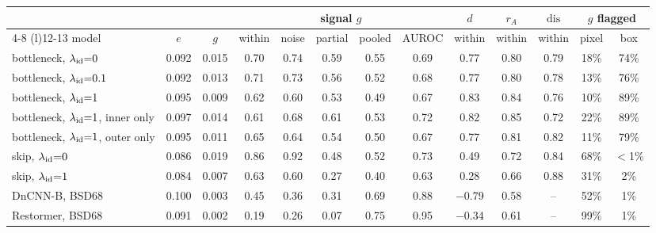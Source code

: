 \setlength{\tabcolsep}{4pt}
\begin{tabular}{@{}lcccccccccccc@{}}
\toprule
& & & \multicolumn{5}{c}{signal $g$} & $d$ & $r_A$ & $\mathrm{dis}$ & \multicolumn{2}{c}{$g$ flagged} \\
\cmidrule(lr){4-8} \cmidrule(l){12-13}
model & $e$ & $g$ & within & noise & partial & pooled & AUROC & within & within & within & pixel & box \\
\midrule
bottleneck, $\lambda_{\mathrm{id}}{=}0$ & 0.092 & 0.015 & 0.70 & 0.74 & 0.59 & 0.55 & 0.69 & 0.77 & 0.80 & 0.79 & 18\% & 74\% \\
bottleneck, $\lambda_{\mathrm{id}}{=}0.1$ & 0.092 & 0.013 & 0.71 & 0.73 & 0.56 & 0.52 & 0.68 & 0.77 & 0.80 & 0.78 & 13\% & 76\% \\
bottleneck, $\lambda_{\mathrm{id}}{=}1$ & 0.095 & 0.009 & 0.62 & 0.60 & 0.53 & 0.49 & 0.67 & 0.83 & 0.84 & 0.76 & 10\% & 89\% \\
bottleneck, $\lambda_{\mathrm{id}}{=}1$, inner only & 0.097 & 0.014 & 0.61 & 0.68 & 0.61 & 0.53 & 0.72 & 0.82 & 0.85 & 0.72 & 22\% & 89\% \\
bottleneck, $\lambda_{\mathrm{id}}{=}1$, outer only & 0.095 & 0.011 & 0.65 & 0.64 & 0.54 & 0.50 & 0.67 & 0.77 & 0.81 & 0.82 & 11\% & 79\% \\
skip, $\lambda_{\mathrm{id}}{=}0$ & 0.086 & 0.019 & 0.86 & 0.92 & 0.48 & 0.52 & 0.73 & 0.49 & 0.72 & 0.84 & 68\% & $<$1\% \\
skip, $\lambda_{\mathrm{id}}{=}1$ & 0.084 & 0.007 & 0.63 & 0.60 & 0.27 & 0.40 & 0.63 & 0.28 & 0.66 & 0.88 & 31\% & 2\% \\
\midrule
DnCNN-B, BSD68 & 0.100 & 0.003 & 0.45 & 0.36 & 0.31 & 0.69 & 0.88 & $-$0.79 & 0.58 & -- & 52\% & 1\% \\
Restormer, BSD68 & 0.091 & 0.002 & 0.19 & 0.26 & 0.07 & 0.75 & 0.95 & $-$0.34 & 0.61 & -- & 99\% & 1\% \\
\bottomrule
\end{tabular}
